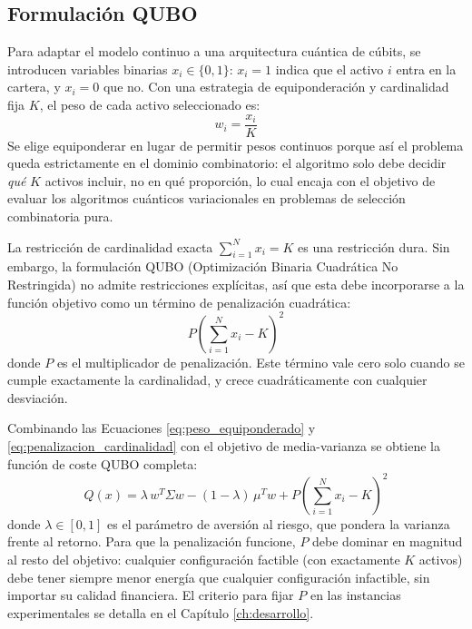 \subsection{Formulación QUBO}
\label{subsec:discretizacion_qubo}

Para adaptar el modelo continuo a una arquitectura cuántica de cúbits, se introducen variables binarias $x_i \in \{0,1\}$: $x_i = 1$ indica que el activo $i$ entra en la cartera, y $x_i = 0$ que no. Con una estrategia de equiponderación y cardinalidad fija $K$, el peso de cada activo seleccionado es:
\begin{equation}
    w_i = \frac{x_i}{K}
    \label{eq:peso_equiponderado}
\end{equation}
Se elige equiponderar en lugar de permitir pesos continuos porque así el problema queda estrictamente en el dominio combinatorio: el algoritmo solo debe decidir \emph{qué} $K$ activos incluir, no en qué proporción, lo cual encaja con el objetivo de evaluar los algoritmos cuánticos variacionales en problemas de selección combinatoria pura.

La restricción de cardinalidad exacta $\sum_{i=1}^N x_i = K$ es una restricción dura. Sin embargo, la formulación QUBO (Optimización Binaria Cuadrática No Restringida) no admite restricciones explícitas, así que esta debe incorporarse a la función objetivo como un término de penalización cuadrática:
\begin{equation}
    P \left( \sum_{i=1}^N x_i - K \right)^2
    \label{eq:penalizacion_cardinalidad}
\end{equation}
donde $P$ es el multiplicador de penalización. Este término vale cero solo cuando se cumple exactamente la cardinalidad, y crece cuadráticamente con cualquier desviación.

Combinando las Ecuaciones \eqref{eq:peso_equiponderado} y \eqref{eq:penalizacion_cardinalidad} con el objetivo de media-varianza se obtiene la función de coste QUBO completa:
\begin{equation}
    Q(x) = \lambda \, w^T \Sigma w - (1-\lambda)\, \mu^T w
    + P \left( \sum_{i=1}^N x_i - K \right)^2
    \label{eq:qubo_completo}
\end{equation}
donde $\lambda \in [0,1]$ es el parámetro de aversión al riesgo, que pondera la varianza frente al retorno. Para que la penalización funcione, $P$ debe dominar en magnitud al resto del objetivo: cualquier configuración factible (con exactamente $K$ activos) debe tener siempre menor energía que cualquier configuración infactible, sin importar su calidad financiera. El criterio para fijar $P$ en las instancias experimentales se detalla en el Capítulo \ref{ch:desarrollo}.

